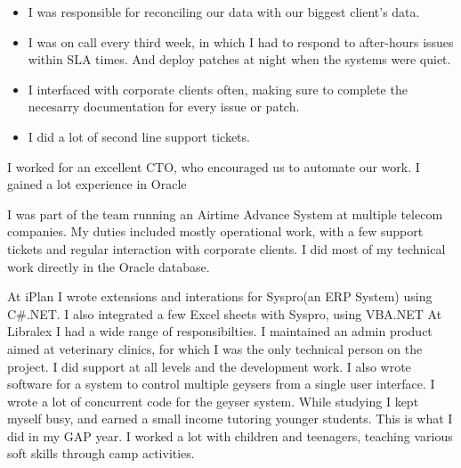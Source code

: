 \documentclass[a4paper]{twentysecondcv} %
\begin{document}
\begin{twenty}
{\begin{itemize}
        \item I was responsible for reconciling our data with our biggest client's data.
        \item I was on call every third week, in which I had to respond to after-hours issues within SLA times. And deploy patches at night when the systems were quiet.
        \item I interfaced with corporate clients often, making sure to complete the necesarry documentation for every issue or patch.
        \item I did a lot of second line support tickets.
    \end{itemize}
    I worked for an excellent CTO, who encouraged us to automate our work. I gained a lot experience in Oracle}
    {I was part of the team running an Airtime Advance System at multiple telecom companies. My duties included mostly operational work, with a few support tickets and regular interaction with corporate clients. I did most of my technical work directly in the Oracle database.}
\end{twenty}




\newpage %

\makeprofile %

\begin{twenty}
    {At iPlan I wrote extensions and interations for Syspro(an ERP System) using C\#.NET. I also integrated a few Excel sheets with Syspro, using VBA.NET}
    {At Libralex I had a wide range of responsibilties. I maintained an admin product aimed at veterinary clinics, for which I was the only technical person on the project. I did support at all levels and the development work. I also wrote software for a system to control multiple geysers from a single user interface. I wrote a lot of concurrent code for the geyser system.}
    {While studying I kept myself busy, and earned a small income tutoring younger students.}
    {This is what I did in my GAP year. I worked a lot with children and teenagers, teaching various soft skills through camp activities.}
\end{twenty}
\end{document}
